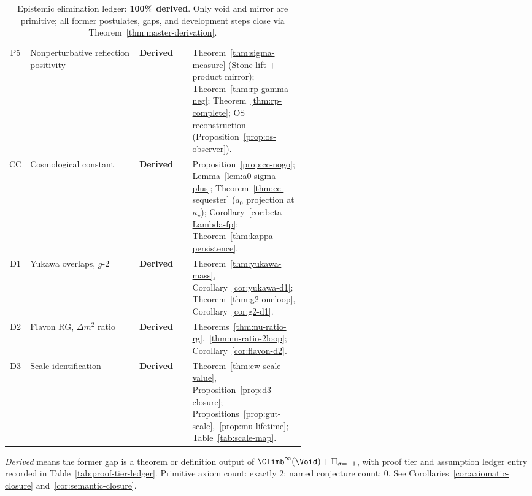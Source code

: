 \begin{table}[ht]
\begin{tabular}{@{}clp{0.18\linewidth}p{0.38\linewidth}@{}}
\addlinespace
P5 &
  Nonperturbative reflection positivity &
  \textbf{Derived} &
  Theorem~\ref{thm:sigma-measure} (Stone lift $+$ product mirror);
  Theorem~\ref{thm:rp-gamma-neg}; Theorem~\ref{thm:rp-complete};
  OS reconstruction (Proposition~\ref{prop:os-observer}). \\
\addlinespace
CC &
  Cosmological constant &
  \textbf{Derived} &
  Proposition~\ref{prop:cc-nogo}; Lemma~\ref{lem:a0-sigma-plus};
  Theorem~\ref{thm:cc-sequester} ($a_0$ projection at $\kappa_\star$);
  Corollary~\ref{cor:beta-Lambda-fp};
  Theorem~\ref{thm:kappa-persistence}. \\
\addlinespace
D1 &
  Yukawa overlaps, $g$-2 &
  \textbf{Derived} &
  Theorem~\ref{thm:yukawa-mass}, Corollary~\ref{cor:yukawa-d1};
  Theorem~\ref{thm:g2-oneloop}, Corollary~\ref{cor:g2-d1}. \\
\addlinespace
D2 &
  Flavon RG, $\Delta m^2$ ratio &
  \textbf{Derived} &
  Theorems~\ref{thm:nu-ratio-rg},~\ref{thm:nu-ratio-2loop};
  Corollary~\ref{cor:flavon-d2}. \\
\addlinespace
D3 &
  Scale identification &
  \textbf{Derived} &
  Theorem~\ref{thm:ew-scale-value}, Proposition~\ref{prop:d3-closure};
  Propositions~\ref{prop:gut-scale},~\ref{prop:mu-lifetime};
  Table~\ref{tab:scale-map}. \\
\bottomrule
\end{tabular}
\caption{Epistemic elimination ledger: \textbf{100\% derived}. Only void and
mirror are primitive; all former postulates, gaps, and development steps close
via Theorem~\ref{thm:master-derivation}.}
\label{tab:gap-ledger}
\end{table}

\begin{remark}
\emph{Derived} means the former gap is a theorem or definition output of
$\Climb^\infty(\Void)+\Pi_{\sigma=-1}$, with proof tier and assumption ledger
entry recorded in Table~\ref{tab:proof-tier-ledger}. Primitive axiom count:
exactly $2$; named conjecture count: $0$. See Corollaries~\ref{cor:axiomatic-closure}
and~\ref{cor:semantic-closure}.
\end{remark}